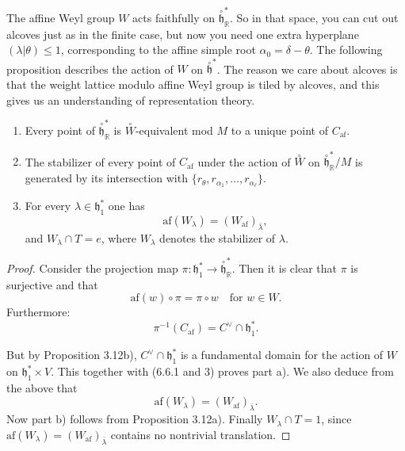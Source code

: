 \documentclass[12pt]{article}
\begin{document}
The affine Weyl group $W$ acts faithfully on $\overset{\circ}{\mathfrak{h}}^*_{\mathbb{R}}$. So in that space, you can cut out alcoves just as in the finite case, but now you need one extra hyperplane $(\lambda|\theta) \leq 1$, corresponding to the affine simple root $\alpha_0 = \delta - \theta$. The following proposition describes the action of $W$ on $\overset{\circ}{\mathfrak{h}}^*$. The reason we care about alcoves is that the weight lattice modulo affine Weyl group is tiled by alcoves, and this gives us an understanding of representation theory.
\begin{proposition}[6.6]
\leavevmode
\begin{enumerate}[label=\alph*)]
\item Every point of $\overset{\circ}{\mathfrak{h}}^*_{\mathbb{R}}$ is $\overset{\circ}{W}$-equivalent mod $M$ to a unique point of $C_{\mathrm{af}}$.

\item The stabilizer of every point of $C_{\mathrm{af}}$ under the action of $\overset{\circ}{W}$ on 
$\overset{\circ}{\mathfrak{h}}^*_{\mathbb{R}} / M$ is generated by its intersection with 
$\{r_\theta, r_{\alpha_1}, \dots, r_{\alpha_\ell}\}$.

\item For every $\lambda \in \mathfrak{h}^*_1$ one has
\[
\mathrm{af}(W_\lambda) = (W_{\mathrm{af}})_{\bar{\lambda}},
\]
and $W_\lambda \cap T = e$, where $W_\lambda$ denotes the stabilizer of $\lambda$.
\end{enumerate}
\end{proposition}

\begin{proof}
Consider the projection map 
\(\pi : \mathfrak{h}^*_1 \to \overset{\circ}{\mathfrak{h}}^*_{\mathbb{R}}\). 
Then it is clear that $\pi$ is surjective and that 
\[
\mathrm{af}(w) \circ \pi = \pi \circ w \quad \text{for } w \in W.
\]
Furthermore:
\[
\pi^{-1}(C_{\mathrm{af}}) = C^\vee \cap \mathfrak{h}^*_1.
\]

But by Proposition 3.12b), $C^\vee \cap \mathfrak{h}^*_1$ is a fundamental domain for the action of $W$ on $\mathfrak{h}^*_1 \times V$. This together with (6.6.1 and 3) proves part a). We also deduce from the above that 
\[
\mathrm{af}(W_\lambda) = (W_{\mathrm{af}})_{\bar{\lambda}}.
\] 
Now part b) follows from Proposition 3.12a). Finally $W_\lambda \cap T = 1$, since $\mathrm{af}(W_\lambda) = (W_{\mathrm{af}})_{\bar{\lambda}}$ contains no nontrivial translation.
\end{proof}
\end{document}
